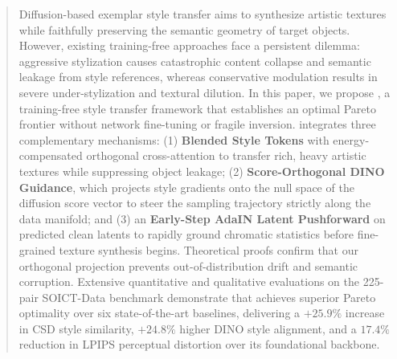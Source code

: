 \begin{abstract}
Diffusion-based exemplar style transfer aims to synthesize artistic textures while faithfully preserving the semantic geometry of target objects. However, existing training-free approaches face a persistent dilemma: aggressive stylization causes catastrophic content collapse and semantic leakage from style references, whereas conservative modulation results in severe under-stylization and textural dilution. In this paper, we propose \textbf{\method}, a training-free style transfer framework that establishes an optimal Pareto frontier without network fine-tuning or fragile inversion. \method integrates three complementary mechanisms: (1) \textbf{Blended Style Tokens} with energy-compensated orthogonal cross-attention to transfer rich, heavy artistic textures while suppressing object leakage; (2) \textbf{Score-Orthogonal DINO Guidance}, which projects style gradients onto the null space of the diffusion score vector to steer the sampling trajectory strictly along the data manifold; and (3) an \textbf{Early-Step AdaIN Latent Pushforward} on predicted clean latents to rapidly ground chromatic statistics before fine-grained texture synthesis begins. Theoretical proofs confirm that our orthogonal projection prevents out-of-distribution drift and semantic corruption. Extensive quantitative and qualitative evaluations on the 225-pair SOICT-Data benchmark demonstrate that \method achieves superior Pareto optimality over six state-of-the-art baselines, delivering a $+25.9\%$ increase in CSD style similarity, $+24.8\%$ higher DINO style alignment, and a $17.4\%$ reduction in LPIPS perceptual distortion over its foundational backbone.

\end{abstract}
